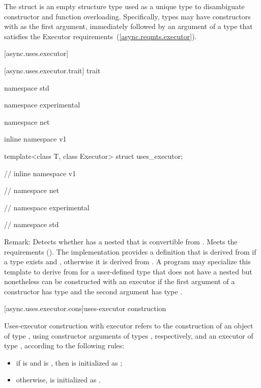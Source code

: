 \pnum
The  struct is an empty structure type used as a unique type to disambiguate constructor and function overloading. Specifically, types may have constructors with  as the first argument, immediately followed by an argument of a type that satisfies the Executor requirements~(\ref{async.reqmts.executor}).



[async.uses.executor]{}


[async.uses.executor.trait]{ trait}

%
\begin{codeblock}
namespace std {
namespace experimental {
namespace net {
inline namespace v1 {

  template<class T, class Executor> struct uses_executor;

} // inline namespace v1
} // namespace net
} // namespace experimental
} // namespace std
\end{codeblock}

\pnum
Remark: Detects whether  has a nested  that is convertible from . Meets the  requirements (). The implementation provides a definition that is derived from  if a type  exists and , otherwise it is derived from . A program may specialize this template to derive from  for a user-defined type  that does not have a nested  but nonetheless can be constructed with an executor if the first argument of a constructor has type  and the second argument has type .



[async.uses.executor.cons]{uses-executor construction}

%
\pnum
Uses-executor construction with executor  refers to the construction of an object  of type , using constructor arguments  of types , respectively, and an executor  of type , according to the following rules:

\begin{itemize}
\item
if  is 
and  is ,
then  is initialized as ;

\item
otherwise,  is initialized as .
\end{itemize}




